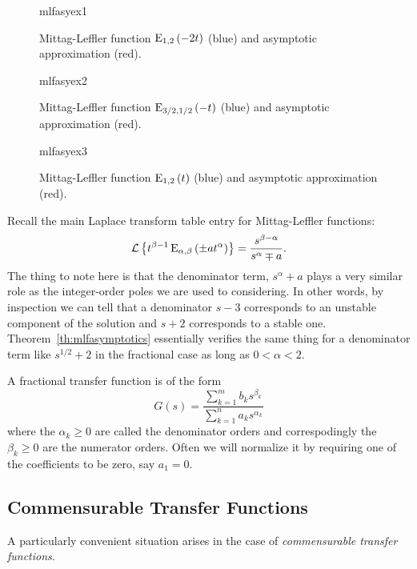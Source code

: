 \begin{figure}  
  \centering
  {mlfasyex1}
  \caption{Mittag-Leffler function $\operatorname{E}_{1,2}\left(-2 t\right)$ (blue) and asymptotic approximation (red).}
  \label{fig:mlfasyex1}
\end{figure}

\begin{figure}  
  \centering
  {mlfasyex2}
  \caption{Mittag-Leffler function $\operatorname{E}_{3/2,1/2}\left(-t\right)$ (blue) and asymptotic approximation (red).}
  \label{fig:mlfasyex2}
\end{figure}

\begin{figure}  
  \centering
  {mlfasyex3}
  \caption{Mittag-Leffler function $\operatorname{E}_{1,2}\left(t\right)$ (blue) and asymptotic approximation (red).}
  \label{fig:mlfasyex3}
\end{figure}

Recall the main Laplace transform table entry for Mittag-Leffler functions:
\begin{equation*}
  \mathcal L \left\{ t^{\beta - 1} \operatorname{E}_{\alpha,\beta} \left( \pm a t^\alpha \right) \right\} = \frac{s^{\beta-\alpha}}{s^\alpha \mp a}.
\end{equation*}
The thing to note here is that the denominator term, $s^\alpha + a$ plays a very similar role as the integer-order poles we are used to considering. In other words, by inspection we can tell that a denominator $s-3$ corresponds to an unstable component of the solution and $s+2$ corresponds to a stable one. Theorem~\ref{th:mlfasymptotics} essentially verifies the same thing for a denominator term like $s^{1/2}+2$ in the fractional case as long as $0 < \alpha < 2$.

\begin{definition}
  A fractional transfer function is of the form
  \begin{equation*}
    G(s) = \frac{\sum_{k=1}^m b_k s^{\beta_k}}{\sum_{k=1}^n a_k s^{\alpha_k}}
  \end{equation*}
  where the $\alpha_k \geq 0$ are called the denominator orders and correspodingly the $\beta_k \geq 0$ are the numerator orders. 
  Often we will normalize it by requiring one of the coefficients to be zero, say $a_1=0$. 
  \label{def:fractionalxf}
\end{definition}

\subsection{Commensurable Transfer Functions}
A particularly convenient situation arises in the case of \emph{commensurable transfer functions}.

